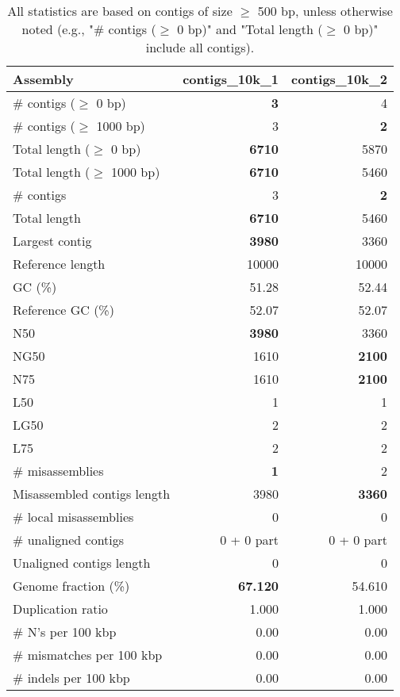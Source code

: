 \documentclass[12pt,a4paper]{article}
\begin{document}
\begin{table}[ht]
\begin{center}
\caption{All statistics are based on contigs of size $\geq$ 500 bp, unless otherwise noted (e.g., "\# contigs ($\geq$ 0 bp)" and "Total length ($\geq$ 0 bp)" include all contigs).}
\begin{tabular}{|l*{2}{|r}|}
\hline
Assembly & contigs\_10k\_1 & contigs\_10k\_2 \\ \hline
\# contigs ($\geq$ 0 bp) & {\bf 3} & 4 \\ \hline
\# contigs ($\geq$ 1000 bp) & 3 & {\bf 2} \\ \hline
Total length ($\geq$ 0 bp) & {\bf 6710} & 5870 \\ \hline
Total length ($\geq$ 1000 bp) & {\bf 6710} & 5460 \\ \hline
\# contigs & 3 & {\bf 2} \\ \hline
Total length & {\bf 6710} & 5460 \\ \hline
Largest contig & {\bf 3980} & 3360 \\ \hline
Reference length & 10000 & 10000 \\ \hline
GC (\%) & 51.28 & 52.44 \\ \hline
Reference GC (\%) & 52.07 & 52.07 \\ \hline
N50 & {\bf 3980} & 3360 \\ \hline
NG50 & 1610 & {\bf 2100} \\ \hline
N75 & 1610 & {\bf 2100} \\ \hline
L50 & 1 & 1 \\ \hline
LG50 & 2 & 2 \\ \hline
L75 & 2 & 2 \\ \hline
\# misassemblies & {\bf 1} & 2 \\ \hline
Misassembled contigs length & 3980 & {\bf 3360} \\ \hline
\# local misassemblies & 0 & 0 \\ \hline
\# unaligned contigs & 0 + 0 part & 0 + 0 part \\ \hline
Unaligned contigs length & 0 & 0 \\ \hline
Genome fraction (\%) & {\bf 67.120} & 54.610 \\ \hline
Duplication ratio & 1.000 & 1.000 \\ \hline
\# N's per 100 kbp & 0.00 & 0.00 \\ \hline
\# mismatches per 100 kbp & 0.00 & 0.00 \\ \hline
\# indels per 100 kbp & 0.00 & 0.00 \\ \hline

\end{tabular}
\end{center}
\end{table}
\end{document}
